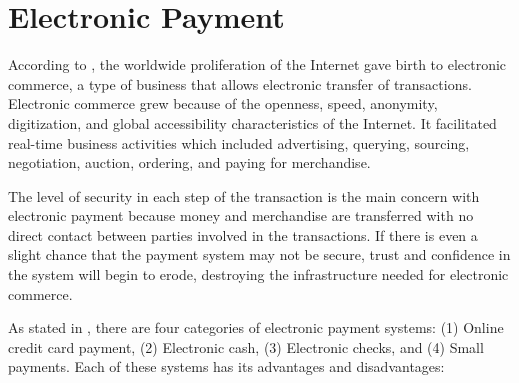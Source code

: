 \section{Electronic Payment}
According to , the worldwide proliferation of the Internet gave birth to electronic commerce, a type of business that allows electronic transfer of transactions. Electronic commerce grew because of the openness, speed, anonymity, digitization, and global accessibility characteristics of the Internet. It facilitated real-time business activities which included advertising, querying, sourcing, negotiation, auction, ordering, and paying for merchandise. 

The level of security in each step of the transaction is the main concern with electronic payment because money and merchandise are transferred with no direct contact between parties involved in the transactions. If there is even a slight chance that the payment system may not be secure, trust and confidence in the system will begin to erode, destroying the infrastructure needed for electronic commerce.

As stated in , there are four categories of electronic payment systems: (1) Online credit card payment, (2) Electronic cash, (3) Electronic checks, and (4) Small payments. Each of these systems has its advantages and disadvantages:

